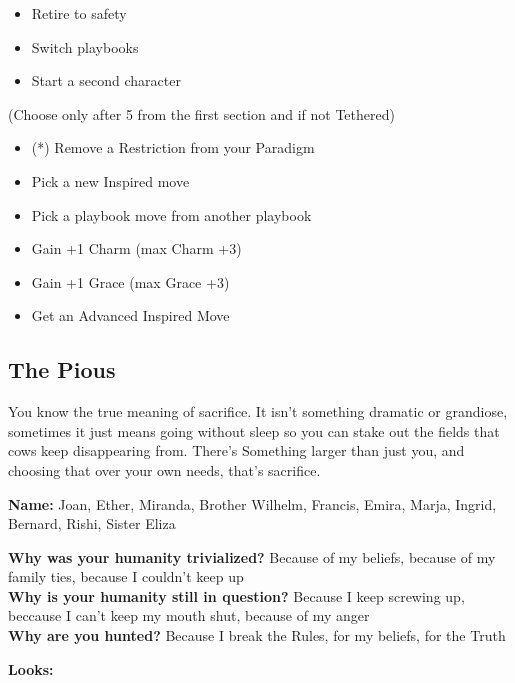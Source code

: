 \documentclass[
]{article}
\providecommand{\tightlist}{%
  \setlength{\itemsep}{0pt}\setlength{\parskip}{0pt}}
\begin{document}
\begin{itemize}
\tightlist
\item
  Retire to safety
\item
  Switch playbooks
\item
  Start a second character
\end{itemize}

(Choose only after 5 from the first section and if not Tethered)

\begin{itemize}
\tightlist
\item
  (*) Remove a Restriction from your Paradigm
\item
  Pick a new Inspired move
\item
  Pick a playbook move from another playbook
\item
  Gain +1 Charm (max Charm +3)
\item
  Gain +1 Grace (max Grace +3)
\item
  Get an Advanced Inspired Move
\end{itemize}

\newpage

\hypertarget{the-pious}{%
\subsection{The Pious}\label{the-pious}}

You know the true meaning of sacrifice. It isn't something dramatic or
grandiose, sometimes it just means going without sleep so you can stake
out the fields that cows keep disappearing from. There's Something
larger than just you, and choosing that over your own needs, that's
sacrifice.

\textbf{Name:} Joan, Ether, Miranda, Brother Wilhelm, Francis, Emira,
Marja, Ingrid, Bernard, Rishi, Sister Eliza

\textbf{Why was your humanity trivialized?} Because of my beliefs,
because of my family ties, because I couldn't keep up\\
\textbf{Why is your humanity still in question?} Because I keep screwing
up, beccause I can't keep my mouth shut, because of my anger\\
\textbf{Why are you hunted?} Because I break the Rules, for my beliefs,
for the Truth

\textbf{Looks:}
\end{document}
